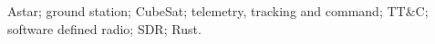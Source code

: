 Astar; ground station; CubeSat; telemetry, tracking and command; TT\&C; software defined radio; SDR; Rust.
